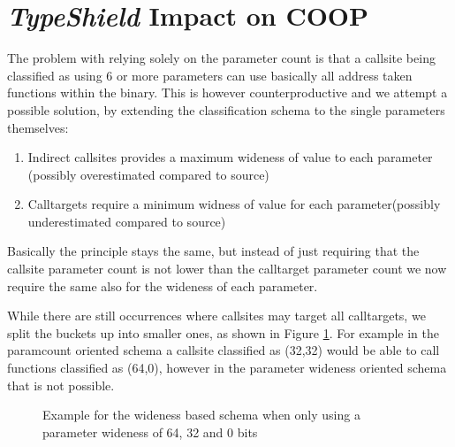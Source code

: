 \section{\textit{TypeShield} Impact on COOP}
\label{TypeShild Impact on COOP}
The problem with relying solely on the parameter count is that a callsite being classified as using 6 or more parameters can use basically all address taken functions within the binary. This is however counterproductive and we attempt a possible solution, by extending the classification schema to the single parameters themselves:

\begin{enumerate}
\item Indirect callsites provides a maximum wideness of value to each parameter (possibly overestimated compared to source)
\item Calltargets require a minimum widness of value for each parameter(possibly underestimated compared to source)
\end{enumerate}

Basically the principle stays the same, but instead of just requiring that the callsite parameter count is not lower than the calltarget parameter count we now require the same also for the wideness of each parameter.

While there are still occurrences where callsites may target all calltargets, we split the buckets up into smaller ones, as shown in Figure \ref{fig:lattice3264}. For example in the paramcount oriented schema a callsite classified as (32,32) would be able to call functions classified as (64,0), however in the parameter wideness oriented schema that is not possible.

\begin{figure}[!h]
\centering
{}
\caption{Example for the wideness based schema when only using a parameter wideness of 64, 32 and 0 bits}
\label{fig:lattice3264}
\end{figure}